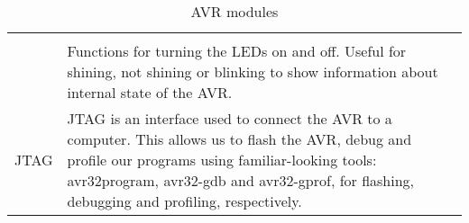 \begin{table}[htbp]
\begin{tabular}{l|p{10cm}}
\begin{comment}
	interrupts and button click callbacks. \CHECK{this does not exists as of
	right now, but it might in the future :)}\\
\end{comment}
	LEDs & Functions for turning the LEDs on and off. Useful for shining, not shining or
	blinking to show information about internal state of the AVR. \\
	\hline
	JTAG & JTAG is an interface used to connect the AVR to a computer. This
	allows us to flash the AVR, debug and profile our programs using
	familiar-looking tools: avr32program, avr32-gdb and avr32-gprof,
	for flashing, debugging and profiling, respectively. \\
\end{tabular}
\caption{AVR modules}
\label{tab:asdasd}
\end{table}
\begin{comment}
\TODO{FAT: reference to comparison benchmarks in appendix?}
\TODO{FGPA/GPIO: more?}
\TODO{Button: predictive writing is never a good idea, that's a surefire way of ending up with outright wrong/contradictive things in our report.}
\TODO{Program: This isn't really a library then, is it?}
\TODO{BMP: Should we remove it? It was like a 10 minute job to make and is utterly useless now...} 
\TODO{SMC/EBI: What? The INTERNAL sram is on the EXTERNAL bus interface? That makes no sense!}
\TODO{JTAG: what use have we had of avr32-gdb and avr32-gprof? Is use of these described in the report? if not why are we mentioning them?}
\end{comment}

